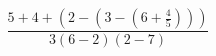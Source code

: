 \documentclass[12pt]{amsart}
\begin{document}
\sicpsize
\[
  \frac{5 + 4  + (2 - (3 - (6 + \frac{4}{5})))}{3(6 - 2)(2 - 7)}
\]
\end{document}
